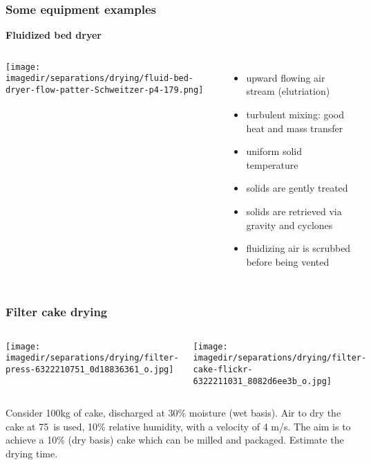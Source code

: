 \begin{frame}\frametitle{Some equipment examples}
	\textbf{Fluidized bed dryer}
	\begin{columns}[t]
			\begin{center}
				\texttt{[image: \\imagedir/separations/drying/fluid-bed-dryer-flow-patter-Schweitzer-p4-179.png]}
			\end{center}
			\vspace{-12pt}
			\begin{itemize}
				\item	upward flowing air stream (elutriation)
				\item	turbulent mixing: good heat and mass transfer
				\item	uniform solid temperature
				\item	solids are gently treated
				\item	solids are retrieved via gravity and cyclones
				\item	fluidizing air is scrubbed before being vented
			\end{itemize}
	\end{columns}
\end{frame}


\begin{frame}\frametitle{Filter cake drying}
	\begin{columns}[b]
		\begin{center}
			\texttt{[image: \\imagedir/separations/drying/filter-press-6322210751\_0d18836361\_o.jpg]}
		\end{center}
			\begin{center}
				\texttt{[image: \\imagedir/separations/drying/filter-cake-flickr-6322211031\_8082d6ee3b\_o.jpg]}
			\end{center}
	\end{columns}
	\vspace{12pt}
	Consider 100kg of cake, discharged at 30\% moisture (wet basis). Air to dry the cake at 75\degC$\,$ is used, 10\% relative humidity, with a velocity of 4 m/s. The aim is to achieve a 10\% (dry basis) cake which can be milled and packaged. Estimate the drying time.
\end{frame}

